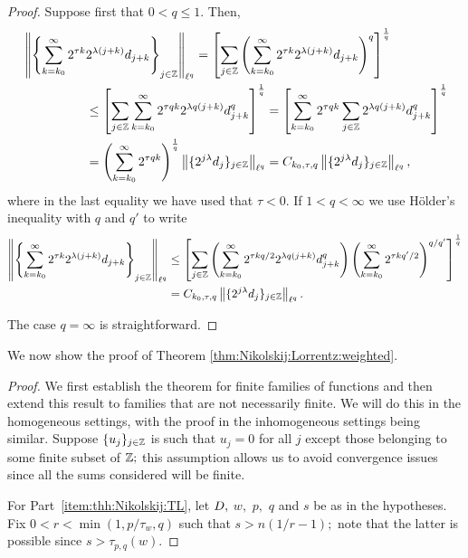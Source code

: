 {{{{{{\begin{proof}
Suppose first that $0 < q \leq 1$. Then,
\begin{align*}
& \left\|\left\{\sum_{k=k_0}^\infty 2^{\tau k} 2^{\lambda(j+k)}d_{j+k}\right\}_{j\in \mathbb{Z}}\right\|_{\ell^q} = \left[\sum_{j \in \mathbb{Z}} \left( \sum_{k=k_0}^\infty 2^{\tau k} 2^{\lambda(j+k)}d_{j+k} \right)^q \right]^\frac{1}{q}\\
& \quad\quad\quad\quad\quad \leq  \left[\sum_{j \in \mathbb{Z}}  \sum_{k=k_0}^\infty 2^{\tau q k} 2^{\lambda q (j+k)}d_{j+k}^q \right]^\frac{1}{q} =  \left[ \sum_{k=k_0}^\infty  2^{\tau q k} \sum_{j \in \mathbb{Z}} 2^{\lambda q (j+k)}d_{j+k}^q \right]^\frac{1}{q}\\
&  \quad\quad\quad \quad \quad = \left(  \sum_{k=k_0}^\infty   2^{\tau q k}     \right)^\frac{1}{q} \left\|\{2^{j \lambda} d_j\}_{j\in \mathbb{Z}}\right\|_{\ell^q} = C_{k_0, \tau, q} \left\|\{2^{j \lambda} d_j\}_{j\in\mathbb{Z}}\right\|_{\ell^q},
\end{align*}
where in the last equality we have used that $\tau < 0$. If $1 < q < \infty$ we use H\"older's inequality with $q$ and $q'$ to write
\begin{align*}
 \left\|\left\{\sum_{k=k_0}^\infty 2^{\tau k} 2^{\lambda(j+k)}d_{j+k}\right\}_{j\in\mathbb{Z}}\right\|_{\ell^q} 
& \le \left[\sum_{j \in \mathbb{Z}}   \left(\sum_{k=k_0}^\infty 2^{\tau k q/2} 2^{\lambda q(j+k)}d_{j+k}^q \right)     \left( \sum_{k=k_0}^\infty 2^{\tau kq'/2} \right)^{q/q'}   \right]^\frac{1}{q}\\
&    =C_{k_0, \tau, q} \left\|\{2^{j \lambda} d_j\}_{j\in\mathbb{Z}}\right\|_{\ell^q}.
\end{align*}

The case $q = \infty$ is straightforward.
\end{proof}

We now show the proof of Theorem \ref{thm:Nikolskij:Lorrentz:weighted}.

\begin{proof} We first establish the theorem for finite families of functions and then extend this result to families that are not necessarily finite.  We will do this in the homogeneous settings, with the proof in the inhomogeneous settings being similar. Suppose $\{u_j\}_{j\in\mathbb{Z}}$ is such that $u_j=0$ for all $j$ except those belonging to some finite subset of $\mathbb{Z};$  this assumption allows us to avoid convergence issues since all the sums  considered will be finite.

For Part~\eqref{item:thh:Nikolskij:TL}, let $D,$ $w,$ $p,$ $q$ and $s$ be as in the hypotheses. Fix $0<r<\min(1,p/\tau_w,q)$ such that  $s>n(1/r-1);$ note that the latter is possible since $s>\tau_{p,q}(w).$ 



\end{proof}}}}}}}
